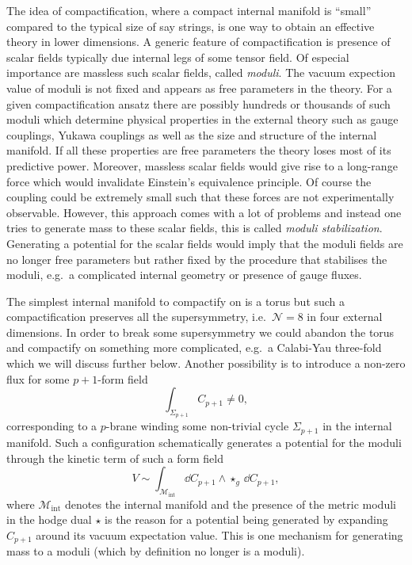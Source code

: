 The idea of compactification, where a compact internal manifold is ``small'' compared to the typical size of say strings, is one way to obtain an effective theory in lower dimensions. A generic feature of compactification is presence of scalar fields typically due internal legs of some tensor field. Of especial importance are massless such scalar fields, called \emph{moduli}. The vacuum expection value of moduli is not fixed and appears as free parameters in the theory. For a given compactification ansatz there are possibly hundreds or thousands of such moduli which determine physical properties in the external theory such as gauge couplings, Yukawa couplings as well as the size and structure of the internal manifold. If all these properties are free parameters the theory loses most of its predictive power. Moreover, massless scalar fields would give rise to a long-range force which would invalidate Einstein's equivalence principle. Of course the coupling could be extremely small such that these forces are not experimentally observable. However, this approach comes with a lot of problems  and instead one tries to generate mass to these scalar fields, this is called \emph{moduli stabilization}. Generating a potential for the scalar fields would imply that the moduli fields are no longer free parameters but rather fixed by the procedure that stabilises the moduli, e.g.\ a complicated internal geometry or presence of gauge fluxes. 

The simplest internal manifold to compactify on is a torus but such a compactification preserves all the supersymmetry, i.e.\ $\mathcal{N}=8$ in four external dimensions. In order to break some supersymmetry we could abandon the torus and compactify on something more complicated, e.g.\ a Calabi-Yau three-fold which we will discuss further below. Another possibility is to introduce a non-zero flux for some $p+1$-form field 
\begin{equation}
    \int_{\Sigma_{p+1}}C_{p+1}\neq 0,
\end{equation}
corresponding to a $p$-brane winding some non-trivial cycle $\Sigma_{p+1}$ in the internal manifold. Such a configuration schematically generates a potential for the moduli through the kinetic term of such a form field 
\begin{equation}
    V\sim \int_{\mathcal{M}_{\text{int}}} \dd C_{p+1}\wedge \star_{g}\,\dd C_{p+1}, 
\end{equation}
where $\mathcal{M}_\text{int}$ denotes the internal manifold and the presence of the metric moduli in the hodge dual $\star$ is the reason for a potential being generated by expanding $C_{p+1}$ around its vacuum expectation value. This is one mechanism for generating mass to a moduli (which by definition no longer is a moduli). 

